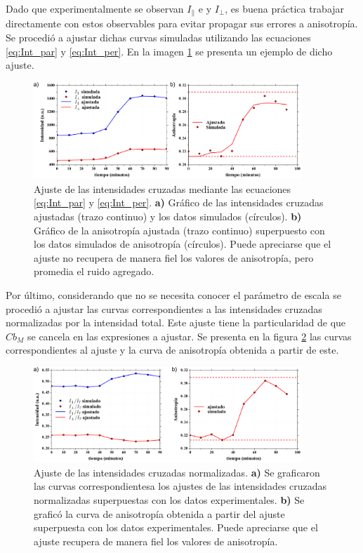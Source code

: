 Dado que experimentalmente se observan $I_{\parallel}$ e y $I_{\perp}$, es buena práctica trabajar directamente con estos observables para evitar propagar sus errores a anisotropía. Se procedió a ajustar dichas curvas simuladas utilizando las ecuaciones \ref{eq:Int_par} y \ref{eq:Int_per}. En la imagen \ref{fig:fit_Icrossed} se presenta un ejemplo de dicho ajuste.

\begin{figure}
\centering
    \includegraphics[width=0.9\textwidth]{./img/AjusteInts.png}
    \caption{Ajuste de las intensidades cruzadas mediante las ecuaciones \ref{eq:Int_par} y \ref{eq:Int_per}. \textbf{a)} Gráfico de las intensidades cruzadas ajustadas (trazo continuo) y los datos simulados (círculos). \textbf{b)} Gráfico de la anisotropía ajustada (trazo continuo) superpuesto con los datos simulados de anisotropía (círculos). Puede apreciarse que el ajuste no recupera de manera fiel los valores de anisotropía, pero promedia el ruido agregado.}
    \label{fig:fit_Icrossed}
\end{figure}

Por último, considerando que no se necesita conocer el parámetro de escala se procedió a ajustar las curvas correspondientes a las intensidades cruzadas normalizadas por la intensidad total. Este ajuste tiene la particularidad de que $C b_M$ se cancela en las expresiones a ajustar. Se presenta en la figura \ref{fig:Int_r_Fit} las curvas correspondientes al ajuste y la curva de anisotropía obtenida a partir de este.

\begin{figure}
\centering
    \includegraphics[width=0.9\textwidth]{./img/Ajuste_Int_r.png}
    \caption{Ajuste de las intensidades cruzadas normalizadas. \textbf{a)} Se graficaron las curvas correspondientesa los ajustes de las intensidades cruzadas normalizadas superpuestas con los datos experimentales. \textbf{b)} Se graficó la curva de anisotropía obtenida a partir del ajuste superpuesta con los datos experimentales. Puede apreciarse que el ajuste recupera de manera fiel los valores de anisotropía.}
    \label{fig:Int_r_Fit}
\end{figure}

